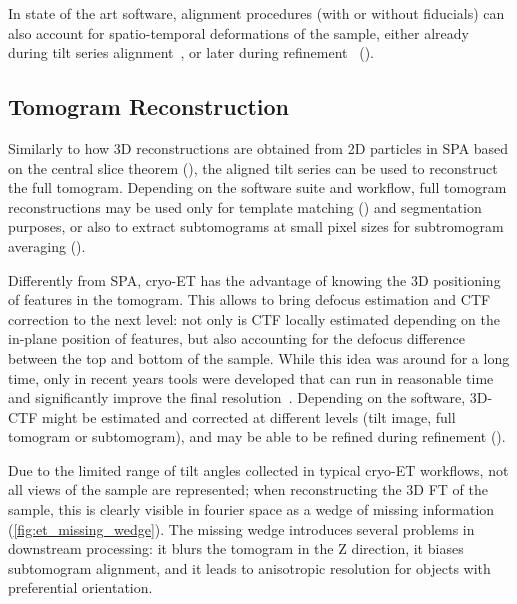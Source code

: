 In state of the art software, alignment procedures (with or without fiducials) can also account for spatio-temporal deformations of the sample, either already during tilt series alignment~\cite{zhengAreTomoIntegratedSoftware2022}, or later during refinement~\cite{tegunovMultiparticleCryoEMRefinement2021,burtImageProcessingPipeline2024,galaz-montoyaSingleParticleTomography2015,chenCompleteDataProcessing2019} ().

\subsection{Tomogram Reconstruction}\label{et_tomo_reconstruction}
Similarly to how 3D reconstructions are obtained from 2D particles in SPA based on the central slice theorem (), the aligned tilt series can be used to reconstruct the full tomogram.
Depending on the software suite and workflow, full tomogram reconstructions may be used only for template matching () and segmentation purposes, or also to extract subtomograms at small pixel sizes for subtromogram averaging ().

Differently from SPA, cryo-ET has the advantage of knowing the 3D positioning of features in the tomogram.
This allows to bring defocus estimation and CTF correction to the next level: not only is CTF locally estimated depending on the in-plane position of features, but also accounting for the defocus difference between the top and bottom of the sample.
While this idea was around for a long time, only in recent years tools were developed that can run in reasonable time and significantly improve the final resolution~\cite{turonovaEfficient3DCTFCorrection2017,tegunovRealtimeCryoelectronMicroscopy2019}. 
Depending on the software, 3D-CTF might be estimated and corrected at different levels (tilt image, full tomogram or subtomogram), and may be able to be refined during refinement ().

Due to the limited range of tilt angles collected in typical cryo-ET workflows, not all views of the sample are represented; when reconstructing the 3D FT of the sample, this is clearly visible in fourier space as a wedge of missing information (\autoref{fig:et_missing_wedge}).
The missing wedge introduces several problems in downstream processing: it blurs the tomogram in the Z direction, it biases subtomogram alignment, and it leads to anisotropic resolution for objects with preferential orientation.

